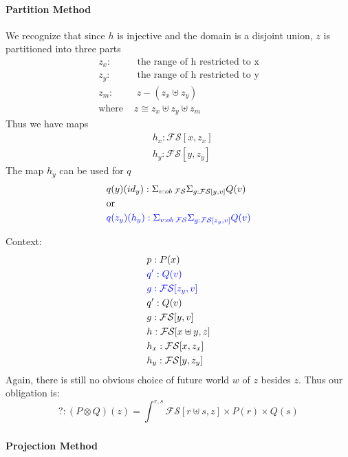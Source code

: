 \documentclass{article}
\newcommand{\blue}[1]{\textcolor{blue}{#1}}
\begin{document}
\paragraph{Partition Method}
We recognize that since $h$ is injective and the domain is a disjoint union, $z$ is partitioned into three parts
\begin{align*}
    z_x :& \textrm{ the range of h restricted to x}\\
    z_y :& \textrm{ the range of h restricted to y}\\
    z_m :& \; z - (z_x \uplus z_y)\\
    \textrm{where } & z \cong z_x \uplus z_y \uplus z_m
\end{align*}
Thus we have maps
\begin{align*}
    &h_x: \mathcal{FS}[x , z_x]\\
    &h_y: \mathcal{FS}[y , z_y]
\end{align*}
The map $h_y$ can be used for $q$
\begin{align*}
        &q(y)(id_y) : \Sigma_{v : ob \;\mathcal{FS}}\Sigma_{g : \mathcal{FS}[ y , v ]}Q(v)\\
        &\textrm{or}\\
        &\blue{q(z_y)(h_y) : \Sigma_{v : ob \;\mathcal{FS}}\Sigma_{g : \mathcal{FS}[ z_y , v ]}Q(v)}
\end{align*}

Context:
\begin{align*}
    &p : P(x)\\
    &\blue{q' : Q(v)}\\
    &\blue{g : \mathcal{FS}[ z_y , v ]}\\
    &q' : Q(v)\\
    &g : \mathcal{FS}[ y , v ]\\
    &h : \mathcal{FS}[x\uplus y , z]\\
    &h_x: \mathcal{FS}[x , z_x]\\
    &h_y: \mathcal{FS}[y , z_y]
\end{align*}
Again, there is still no obvious choice of future world $w$ of $z$ besides $z$.
Thus our obligation is:
\[
    ? : (P \otimes Q)(z) = \int_{}^{r,s} \mathcal{FS}[r \uplus s,z ] 
    \times P(r) \times Q(s)
\]

\paragraph{Projection Method}
\end{document}
